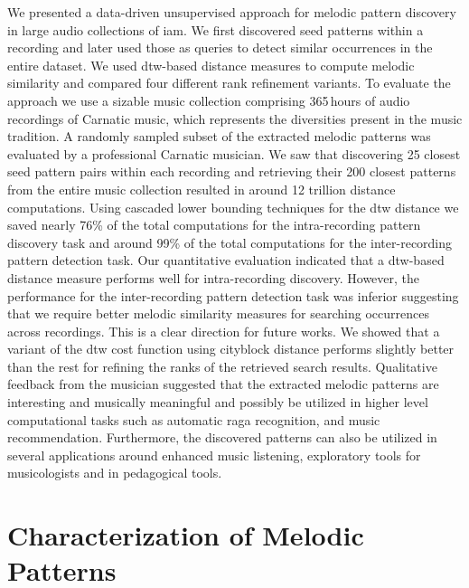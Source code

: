 We presented a data-driven unsupervised approach for melodic pattern discovery in large audio collections of \gls{iam}. We first discovered seed patterns within a recording and later used those as queries to detect similar occurrences in the entire dataset. We used \gls{dtw}-based distance measures to compute melodic similarity and compared four different rank refinement variants. To evaluate the approach we use a sizable music collection comprising 365\,hours of audio recordings of Carnatic music, which represents the diversities present in the music tradition. A randomly sampled subset of the extracted melodic patterns was evaluated by a professional Carnatic musician. We saw that discovering 25 closest seed pattern pairs within each recording and retrieving their 200 closest patterns from the entire music collection resulted in around 12 trillion distance computations. Using cascaded lower bounding techniques for the \gls{dtw} distance we saved nearly 76\% of the total computations for the intra-recording pattern discovery task and around 99\% of the total computations for the inter-recording pattern detection task. Our quantitative evaluation indicated that a \gls{dtw}-based distance measure performs well for intra-recording discovery. However, the performance for the inter-recording pattern detection task was inferior suggesting that we require better melodic similarity measures for searching occurrences across recordings. This is a clear direction for future works. We showed that a variant of the \gls{dtw} cost function using cityblock distance performs slightly better than the rest for refining the ranks of the retrieved search results. Qualitative feedback from the musician suggested that the extracted melodic patterns are interesting and musically meaningful and possibly be utilized in higher level computational tasks such as automatic \gls{raga} recognition, and music recommendation. Furthermore, the discovered patterns can also be utilized in several applications around enhanced music listening, exploratory tools for musicologists and in pedagogical tools.





\section{Characterization of Melodic Patterns}
\label{sec:patterns_characterization_of_melodic_patterns}

